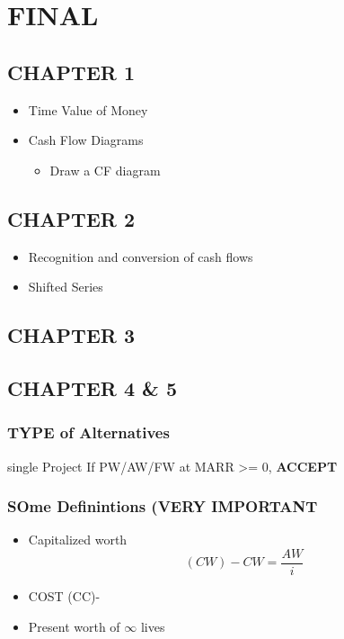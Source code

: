 \documentclass[11pt]{article}
\author{daniel}
\date{\today}
\title{}
\begin{document}
\tableofcontents

\section{FINAL}
\label{sec:orgheadline21}
\subsection{CHAPTER 1}
\label{sec:orgheadline1}
\begin{itemize}
\item Time Value of Money
\item Cash Flow Diagrams
\begin{itemize}
\item Draw a CF diagram
\end{itemize}
\end{itemize}
\subsection{CHAPTER 2}
\label{sec:orgheadline2}
\begin{itemize}
\item Recognition and conversion of cash flows
\item Shifted Series
\end{itemize}
\subsection{CHAPTER 3}
\label{sec:orgheadline3}
\subsection{CHAPTER 4 \& 5}
\label{sec:orgheadline6}
\subsubsection{TYPE of Alternatives}
\label{sec:orgheadline4}
single Project
If PW/AW/FW at MARR >= 0, \textbf{ACCEPT}

\subsubsection{SOme Definintions (VERY IMPORTANT}
\label{sec:orgheadline5}
\begin{itemize}
\item Capitalized worth
\begin{equation}
 (CW)-  CW= \frac{AW}{i}
\end{equation}
\end{itemize}
\begin{itemize}
\item COST (CC)-

\item Present worth of \(\infty\) lives
\end{itemize}
\end{document}
